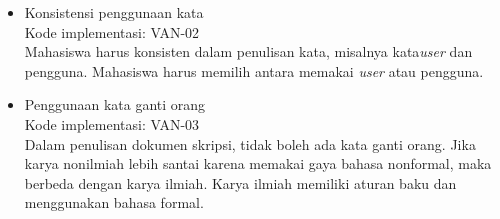 \begin{enumerate}
\begin{itemize}
			\item Konsistensi penggunaan kata \\
			Kode implementasi: VAN-02 \\
			Mahasiswa harus konsisten dalam penulisan kata, misalnya kata\textit{user} dan pengguna.  Mahasiswa harus memilih antara memakai \textit{user} atau pengguna.
			
			\item Penggunaan kata ganti orang \\
			Kode implementasi: VAN-03 \\
			Dalam penulisan dokumen skripsi, tidak boleh ada kata ganti orang. Jika karya nonilmiah lebih santai karena memakai gaya bahasa nonformal, maka berbeda dengan karya ilmiah. Karya ilmiah memiliki aturan baku dan menggunakan bahasa formal. 
			
		\end{itemize}
		
\end{enumerate}